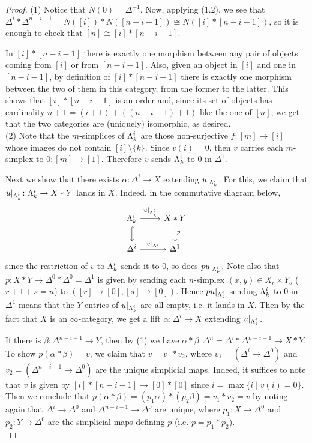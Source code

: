 \documentclass[a4paper,11pt,openany]{scrartcl}
\begin{document}
\newpage
{}
\begin{proof}
    (1) Notice that $N(0)=\Delta^{-1}$. Now, applying (1.2), we see that
    $\Delta^i*\Delta^{n-i-1}=N([i])*N([n-i-1])\cong N([i]*[n-i-1])$, so it is
    enough to check that $[n]\cong [i]*[n-i-1]$.

    In $[i]*[n-i-1]$ there is exactly one morphism between any pair of objects
    coming from $[i]$ or from $[n-i-1]$. Also, given an object in $[i]$ and one
    in $[n-i-1]$, by definition of $[i]*[n-i-1]$ there is exactly one morphism
    between the two of them in this category, from the former to the latter.
    This shows that $[i]*[n-i-1]$ is an order and, since its set of objects has
    cardinality $n+1=(i+1)+((n-i-1)+1)$ like the one of $[n]$, we get that the
    two categories are (uniquely) isomorphic, as desired. \\

    (2) Note that the $m$-simplices of $\Lambda^i_k$ are those non-surjective $f\colon[m]\to[i]$ whose images do not contain $[i]\setminus\{k\}$. Since $v(i)=0$, then $v$ carries each $m$-simplex to $0\colon[m]\to[1]$. Therefore $v$ sends $\Lambda^i_k$ to $0$ in $\Delta^1$.

Next we show that there exists $\alpha\colon\Delta^i\to X$ extending $u|_{\Lambda^i_k}$. For this, we claim that $u|_{\Lambda^i_k}\colon\Lambda^i_k\to X*Y$ lands in $X$. Indeed, in the commutative diagram below,
\[
\begin{tikzcd}
\La^i_k\arrow[r,"u|_{\Lambda^i_k}"]\arrow[d,hookrightarrow]& X*Y\arrow[d,"p"]\\
\Delta^i\arrow[r,"v|_{\Delta^i}"]& \Delta^1
\end{tikzcd}
\]
since the restriction of $v$ to $\Lambda^i_k$ sends it to $0$, so does $pu|_{\Lambda^i_k}$. Note also that $p\colon X*Y\to\Delta^0*\Delta^0=\Delta^1$ is given by sending each $n$-simplex $(x,y)\in X_r\times Y_s$ ($r+1+s=n$) to $([r]\to[0],[s]\to[0])$. Hence $pu|_{\Lambda^i_k}$ sending $\Lambda^i_k$ to $0$ in $\Delta^1$ means that the $Y$-entries of $u|_{\Lambda^i_k}$ are all empty, i.e. it lands in $X$. Then by the fact that $X$ is an $\infty$-category, we get a lift $\alpha\colon\Delta^i\to X$ extending $u|_{\Lambda^i_k}$.

If there is $\beta\colon\Delta^{n-i-1}\to Y$, then by (1) we have $\alpha*\beta\colon\Delta^n=\Delta^i*\Delta^{n-i-1}\to X*Y$. To show $p(\alpha*\beta)=v$, we claim that $v=v_1*v_2$, where $v_1=(\Delta^i\to\Delta^0)$ and $v_2=(\Delta^{n-i-1}\to\Delta^0)$ are the unique simplicial maps. Indeed, it suffices to note that  $v$ is given by $[i]*[n-i-1]\to[0]*[0]$ since $i=\max\{i\mid v(i)=0\}$. Then we conclude that $p(\alpha*\beta)=(p_1\alpha)*(p_2\beta)=v_1*v_2=v$ by noting again that $\Delta^i\to\Delta^0$ and $\Delta^{n-i-1}\to\Delta^0$ are unique, where $p_1\colon X\to\Delta^0$ and $p_2\colon Y\to\Delta^0$ are the simplicial maps defining $p$ (i.e. $p=p_1*p_2$).\\


\end{proof}
\end{document}

